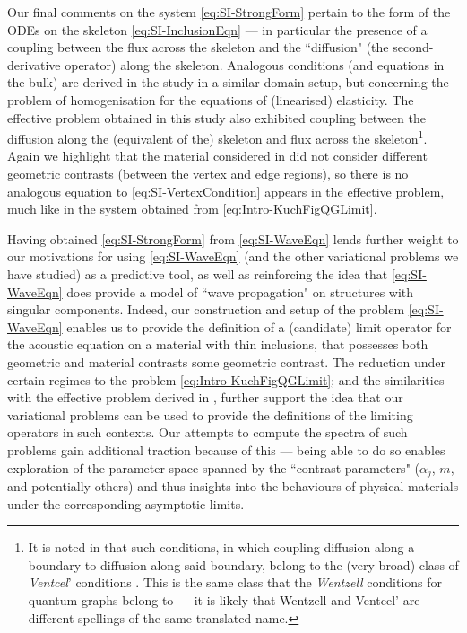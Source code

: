 Our final comments on the system \eqref{eq:SI-StrongForm} pertain to the form of the ODEs on the skeleton \eqref{eq:SI-InclusionEqn} --- in particular the presence of a coupling between the flux across the skeleton and the ``diffusion" (the second-derivative operator) along the skeleton.
Analogous conditions (and equations in the bulk) are derived in the study \cite{cherednichenko2019homogenisation} in a similar domain setup, but concerning the problem of homogenisation for the equations of (linearised) elasticity.
The effective problem obtained in this study also exhibited coupling between the diffusion along the (equivalent of the) skeleton and flux across the skeleton\footnote{It is noted in \cite{cherednichenko2019homogenisation} that such conditions, in which coupling diffusion along a boundary to diffusion along said boundary, belong to the (very broad) class of \emph{Ventcel}' conditions \cite{venttsel1959boundary}. This is the same class that the \emph{Wentzell} conditions for quantum graphs belong to --- it is likely that Wentzell and Ventcel' are different spellings of the same translated name.}.
Again we highlight that the material considered in \cite{cherednichenko2019homogenisation} did not consider different geometric contrasts (between the vertex and edge regions), so there is no analogous equation to \eqref{eq:SI-VertexCondition} appears in the effective problem, much like in the system obtained from \eqref{eq:Intro-KuchFigQGLimit}.

Having obtained \eqref{eq:SI-StrongForm} from \eqref{eq:SI-WaveEqn} lends further weight to our motivations for using \eqref{eq:SI-WaveEqn} (and the other variational problems we have studied) as a predictive tool, as well as reinforcing the idea that \eqref{eq:SI-WaveEqn} does provide a model of ``wave propagation" on structures with singular components.
Indeed, our construction and setup of the problem \eqref{eq:SI-WaveEqn} enables us to provide the definition of a (candidate) limit operator for the acoustic equation on a material with thin inclusions, that possesses both geometric and material contrasts some geometric contrast.
The reduction under certain regimes to the problem \eqref{eq:Intro-KuchFigQGLimit}; and the similarities with the effective problem derived in \cite{cherednichenko2019homogenisation}, further support the idea that our variational problems can be used to provide the definitions of the limiting operators in such contexts.
Our attempts to compute the spectra of such problems gain additional traction because of this --- being able to do so enables exploration of the parameter space spanned by the ``contrast parameters" ($\alpha_j$, $m$, and potentially others) and thus insights into the behaviours of physical materials under the corresponding asymptotic limits.